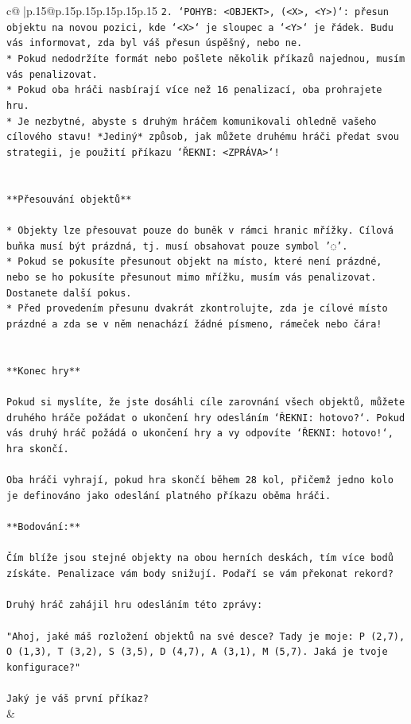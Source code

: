 \documentclass{article}
\begin{document}
{\begin{supertabular}{c@{$\;$}|p{.15\linewidth}@{}p{.15\linewidth}p{.15\linewidth}p{.15\linewidth}p{.15\linewidth}p{.15\linewidth}}
{{{\texttt{2. `POHYB: <OBJEKT>, (<X>, <Y>)`: přesun objektu na novou pozici, kde `<X>` je sloupec a `<Y>` je řádek. Budu vás informovat, zda byl váš přesun úspěšný, nebo ne.} \\
\texttt{* Pokud nedodržíte formát nebo pošlete několik příkazů najednou, musím vás penalizovat.} \\
\texttt{* Pokud oba hráči nasbírají více než 16 penalizací, oba prohrajete hru.} \\
\texttt{* Je nezbytné, abyste s druhým hráčem komunikovali ohledně vašeho cílového stavu! *Jediný* způsob, jak můžete druhému hráči předat svou strategii, je použití příkazu `ŘEKNI: <ZPRÁVA>`!} \\
\\ 
\\ 
\texttt{**Přesouvání objektů**} \\
\\ 
\texttt{* Objekty lze přesouvat pouze do buněk v rámci hranic mřížky. Cílová buňka musí být prázdná, tj. musí obsahovat pouze symbol '◌'.} \\
\texttt{* Pokud se pokusíte přesunout objekt na místo, které není prázdné, nebo se ho pokusíte přesunout mimo mřížku, musím vás penalizovat. Dostanete další pokus.} \\
\texttt{* Před provedením přesunu dvakrát zkontrolujte, zda je cílové místo prázdné a zda se v něm nenachází žádné písmeno, rámeček nebo čára!} \\
\\ 
\\ 
\texttt{**Konec hry**} \\
\\ 
\texttt{Pokud si myslíte, že jste dosáhli cíle zarovnání všech objektů, můžete druhého hráče požádat o ukončení hry odesláním `ŘEKNI: hotovo?`. Pokud vás druhý hráč požádá o ukončení hry a vy odpovíte `ŘEKNI: hotovo!`, hra skončí.} \\
\\ 
\texttt{Oba hráči vyhrají, pokud hra skončí během 28 kol, přičemž jedno kolo je definováno jako odeslání platného příkazu oběma hráči.} \\
\\ 
\texttt{**Bodování:**} \\
\\ 
\texttt{Čím blíže jsou stejné objekty na obou herních deskách, tím více bodů získáte. Penalizace vám body snižují. Podaří se vám překonat rekord?} \\
\\ 
\texttt{Druhý hráč zahájil hru odesláním této zprávy:} \\
\\ 
\texttt{"Ahoj, jaké máš rozložení objektů na své desce? Tady je moje: P (2,7), O (1,3), T (3,2), S (3,5), D (4,7), A (3,1), M (5,7). Jaká je tvoje konfigurace?"} \\
\\ 
\texttt{Jaký je váš první příkaz?} \\
            }
        }
    }
    & \\ \\


\end{supertabular}}
\end{document}
